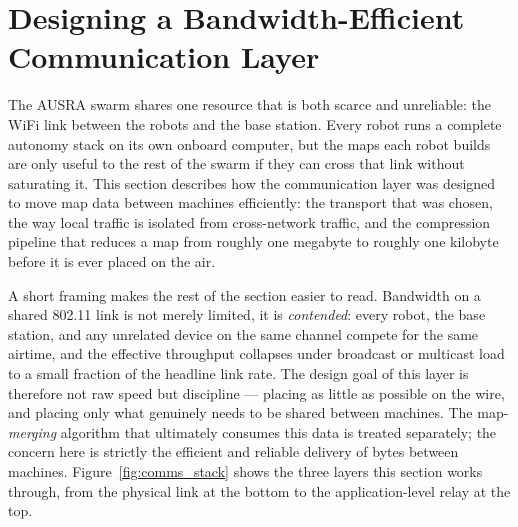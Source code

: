 \section{Designing a Bandwidth-Efficient Communication Layer}
\label{sec:comms_bandwidth}

The AUSRA swarm shares one resource that is both scarce and unreliable: the WiFi link between the robots and the base station. Every robot runs a complete autonomy stack on its own onboard computer, but the maps each robot builds are only useful to the rest of the swarm if they can cross that link without saturating it. This section describes how the communication layer was designed to move map data between machines efficiently: the transport that was chosen, the way local traffic is isolated from cross-network traffic, and the compression pipeline that reduces a map from roughly one megabyte to roughly one kilobyte before it is ever placed on the air.

A short framing makes the rest of the section easier to read. Bandwidth on a shared 802.11 link is not merely limited, it is \emph{contended}: every robot, the base station, and any unrelated device on the same channel compete for the same airtime, and the effective throughput collapses under broadcast or multicast load to a small fraction of the headline link rate. The design goal of this layer is therefore not raw speed but discipline --- placing as little as possible on the wire, and placing only what genuinely needs to be shared between machines. The map-\emph{merging} algorithm that ultimately consumes this data is treated separately; the concern here is strictly the efficient and reliable delivery of bytes between machines. Figure~\ref{fig:comms_stack} shows the three layers this section works through, from the physical link at the bottom to the application-level relay at the top.

